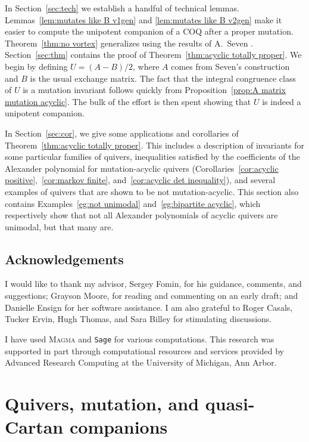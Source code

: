 \documentclass[11pt, letterpaper]{amsart}
\theoremstyle{definition}
\numberwithin{equation}{section}
\begin{document}
In Section~\ref{sec:tech} we establish a handful of technical lemmas.
Lemmas~\ref{lem:mutates like B v1gen} and \ref{lem:mutates like B v2gen} make it easier to compute the unipotent companion of a COQ after a proper mutation.
Theorem~\ref{thm:no vortex} generalizes \cite[Corollary~13.3]{COQ} using the results of A.~Seven \cite{SevenAMatrices}.
Section~\ref{sec:thm} contains the proof of Theorem~\ref{thm:acyclic totally proper}.
We begin by defining $U=(A-B)/2$, where $A$ comes from Seven's construction and $B$ is the usual exchange matrix. 
The fact that the integral congruence class of $U$ is a mutation invariant follows quickly from Proposition~\ref{prop:A matrix mutation acyclic}.
The bulk of the effort is then spent showing that $U$ is indeed a unipotent companion. 

In Section~\ref{sec:cor}, we give some applications and corollaries of Theorem~\ref{thm:acyclic totally proper}. 
This includes a description of invariants for some particular families of quivers, inequalities satisfied by the coefficients of the Alexander polynomial for mutation-acyclic quivers (Corollaries~\ref{cor:acyclic positive},~\ref{cor:markov finite}, and~\ref{cor:acyclic det inequality}), and several examples of quivers that are shown to be not mutation-acyclic. 
This section also contains Examples~\ref{eg:not unimodal} and~\ref{eg:bipartite acyclic}, which respectively show that not all Alexander polynomials of acyclic quivers are unimodal, but that many are. 


\subsection*{Acknowledgements}
I would like to thank my advisor, Sergey Fomin, for his guidance, comments, and suggestions; 
Grayson Moore, for reading and commenting on an early draft; 
and Danielle Ensign for her software assistance.
I am also grateful to Roger Casals, Tucker Ervin, Hugh Thomas, and Sara Billey for stimulating discussions.

I have used \textsc{Magma} and \texttt{Sage} for various computations.
This research was supported in part through computational resources and services provided by Advanced Research Computing at the University of Michigan, Ann Arbor. 

\newpage

\section{Quivers, mutation, and quasi-Cartan companions}
\label{sec:quivs}
\end{document}
